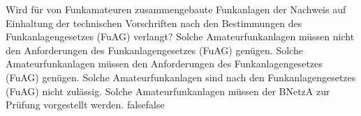     {Wird für von Funkamateuren zusammengebaute Funkanlagen der Nachweis auf Einhaltung der technischen Vorschriften nach den Bestimmungen des Funkanlagengesetzes (FuAG) verlangt?}
    {Solche Amateurfunkanlagen müssen nicht den Anforderungen des Funkanlagengesetzes (FuAG) genügen.}
    {Solche Amateurfunkanlagen müssen den Anforderungen des Funkanlagengesetzes (FuAG) genügen.}
    {Solche Amateurfunkanlagen sind nach den Funkanlagengesetzes (FuAG) nicht zulässig.}
    {Solche Amateurfunkanlagen müssen der BNetzA zur Prüfung vorgestellt werden.}
    {false}{false}
